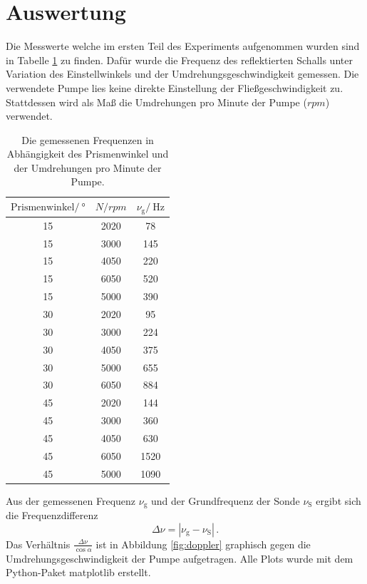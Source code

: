 \section{Auswertung}
\label{sec:Auswertung}

Die Messwerte welche im ersten Teil des Experiments aufgenommen wurden sind in Tabelle \ref{tab:doppler} zu finden.
Dafür wurde die Frequenz des reflektierten Schalls unter Variation des Einstellwinkels und der Umdrehungsgeschwindigkeit gemessen.
Die verwendete Pumpe lies keine direkte Einstellung der Fließgeschwindigkeit zu.
Stattdessen wird als Maß die Umdrehungen pro Minute der Pumpe ($rpm$) verwendet.

\begin{table}
    \centering
    \begin{tabular}{ccc}
    \toprule
    $\text{Prismenwinkel}/\SI{}{\degree}$ & $N/rpm$ &  $\nu_\text{g}/\SI{}{\Hz}$ \\
    \midrule
    15 & 2020 & 78      \\
    15 & 3000 & 145     \\
    15 & 4050 & 220     \\
    15 & 6050 & 520     \\
    15 & 5000 & 390     \\
    30 & 2020 & 95      \\
    30 & 3000 & 224     \\
    30 & 4050 & 375     \\
    30 & 5000 & 655     \\
    30 & 6050 & 884     \\
    45 & 2020 & 144     \\
    45 & 3000 & 360     \\
    45 & 4050 & 630     \\
    45 & 6050 & 1520    \\
    45 & 5000 & 1090    \\
    \bottomrule
    \end{tabular}
    \caption{Die gemessenen Frequenzen in Abhängigkeit des Prismenwinkel und der Umdrehungen pro Minute der Pumpe.}
    \label{tab:doppler}
\end{table}

Aus der gemessenen Frequenz $\nu_\text{g}$ und der Grundfrequenz der Sonde $\nu_\text{S}$ ergibt sich die Frequenzdifferenz
\begin{equation*}
    \Delta \nu = \left| \nu_\text{g}-\nu_\text{S} \right| \, .
\end{equation*}
Das Verhältnis $\frac{\Delta \nu}{\cos \alpha}$ ist in Abbildung \ref{fig:doppler} graphisch gegen die Umdrehungsgeschwindigkeit der Pumpe aufgetragen.
Alle Plots wurde mit dem Python-Paket matplotlib \cite{matplotlib} erstellt.

